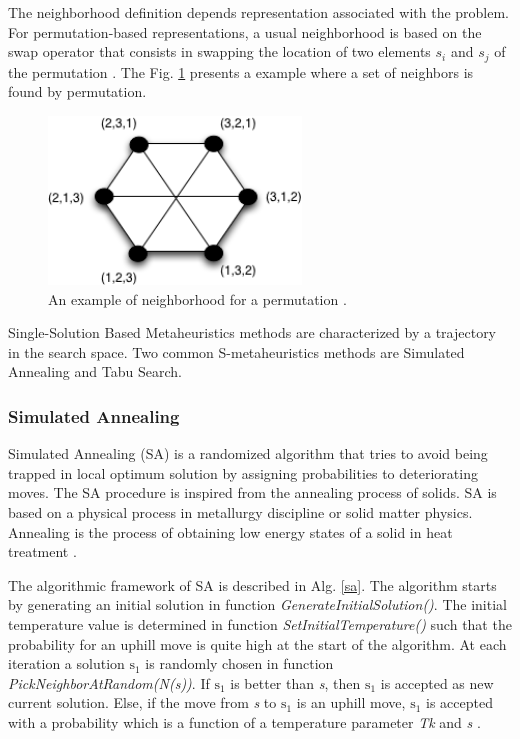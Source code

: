 The neighborhood definition depends  representation associated with the problem. For permutation-based representations, a usual neighborhood is based on the swap operator that consists in swapping the location of two elements $s_i$ and $s_j$ of the permutation \cite{Talbi2013}. The Fig. \ref{fig:sperneighborhood} presents a example where a set of neighbors is found by permutation. 


\begin{figure}[h]
\centering
\includegraphics[width=0.6\textwidth]{./images/neighborhood.png}
\caption{ An example of neighborhood for a permutation \cite{Talbi2013}.}
\label{fig:sperneighborhood}
\end{figure}



Single-Solution Based Metaheuristics methods are characterized by a trajectory in the search space. Two common S-metaheuristics methods are Simulated Annealing and Tabu Search.


\subsubsection{Simulated Annealing}

Simulated Annealing (SA) is a randomized algorithm that tries to avoid being trapped in local optimum solution by assigning probabilities to deteriorating moves. The SA procedure is inspired from the annealing process of solids. SA is based on a physical
process in metallurgy discipline or solid matter physics. Annealing is the process of obtaining low energy states of a solid in heat treatment \cite{Jaziri2008}. 

The algorithmic framework of SA is described in Alg. \ref{sa}.  The algorithm starts by generating an initial solution in function \textit{GenerateInitialSolution()}. The initial temperature value is determined in function \textit{SetInitialTemperature()} such that the probability for an uphill move is quite high at the start of the algorithm. At each iteration a solution $\mbox{s}_1$ is randomly chosen in function \textit{PickNeighborAtRandom(N(s))}. If \textit{$\mbox{s}_1$} is better than \textit{s}, then \textit{$\mbox{s}_1$} is accepted as new current solution. Else, if the move from \textit{s} to \textit{$\mbox{s}_1$} is an uphill move, \textit{$\mbox{s}_1$}  is accepted with a probability which is a function of a temperature parameter \textit{Tk} and \textit{s} \cite{raidl2010metaheuristic}. 

